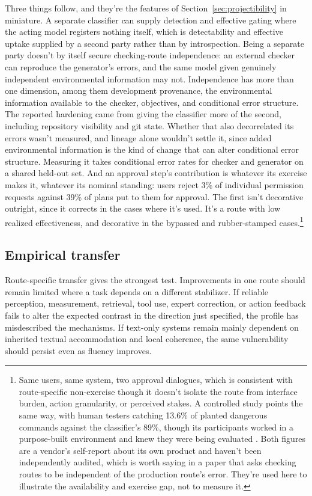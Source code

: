 \documentclass[12pt]{article}
\begin{document}
Three things follow, and they're the features of
Section~\ref{sec:projectibility} in miniature. A separate classifier can supply detection
and effective gating where the acting model registers nothing itself, which is detectability
and effective uptake supplied by a second party rather than by introspection. Being a
separate party doesn't by itself secure checking-route independence: an external checker can
reproduce the generator's errors, and the same model given genuinely independent environmental
information may not. Independence has more than one dimension, among them development
provenance, the environmental information available to the checker, objectives, and
conditional error structure. The reported hardening came from giving the classifier more
of the second, including repository visibility and git state. Whether that also
decorrelated its errors wasn't measured, and lineage alone wouldn't settle it, since added
environmental information is the kind of change that can alter conditional error structure.
Measuring it takes conditional error rates for checker and generator on a shared held-out
set. And an approval step's contribution is whatever its
exercise makes it, whatever its nominal standing: users reject 3\% of individual permission
requests against 39\% of plans put to them for approval. The first isn't decorative outright,
since it corrects in the cases where it's used. It's a route with low realized effectiveness,
and decorative in the bypassed and rubber-stamped cases.\footnote{Same users, same system, two approval dialogues, which is consistent
with route-specific non-exercise though it doesn't isolate the route from interface
burden, action granularity, or perceived stakes. A controlled study points the same
way, with human testers catching 13.6\% of planted dangerous commands against the
classifier's 89\%, though its participants worked in a purpose-built environment and knew
they were being evaluated \citep{anthropic2026automode}. Both figures are a vendor's
self-report about its own product and haven't been independently audited, which is worth
saying in a paper that asks checking routes to be independent of the
production route's error. They're used here to illustrate the availability and exercise
gap, not to measure it.}

\subsection{Empirical transfer}\label{ssec:transfer}

Route-specific transfer gives the strongest test. Improvements in one route should remain
limited where a task depends on a different stabilizer. If reliable perception,
measurement, retrieval, tool use, expert correction, or action feedback fails to alter
the expected contrast in the direction just specified, the profile has misdescribed the
mechanisms. If text-only systems remain mainly dependent on inherited textual
accommodation and local coherence, the same vulnerability should persist even as fluency
improves.
\end{document}
